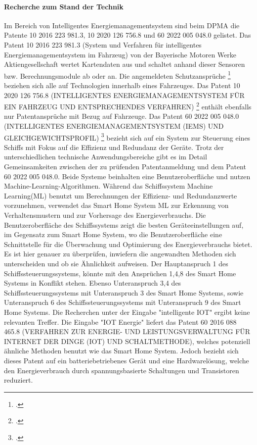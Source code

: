 \paragraph{Recherche zum Stand der Technik}
Im Bereich von Intelligentes Energiemanagementsystem sind beim DPMA die Patente
10 2016 223 981.3, 10 2020 126 756.8 und 60 2022 005 048.0 gelistet. Das Patent
10 2016 223 981.3 (System und Verfahren für intelligentes Energiemanagementsystem im Fahrzeug)
von der Bayerische Motoren Werke Aktiengesellschaft wertet Kartendaten aus 
und schaltet anhand dieser Sensoren bzw. Berechnungsmodule ab oder an.
Die angemeldeten Schutzansprüche \footcite{DPMAregisterRecherchierbarerText} beziehen
sich alle auf Technologien innerhalb eines Fahrzeuges.
Das Patent 10 2020 126 756.8 (INTELLIGENTES ENERGIEMANAGEMENTSYSTEM FÜR EIN FAHRZEUG UND ENTSPRECHENDES VERFAHREN)
\footcite{DPMAregisterRecherchierbarerTexta} enthält ebenfalls nur
Patentansprüche mit Bezug auf Fahrzeuge.
Das Patent 60 2022 005 048.0 (INTELLIGENTES ENERGIEMANAGEMENTSYSTEM (IEMS) UND GLEICHGEWICHTSPROFIL)
\footcite{DPMAregisterRecherchierbarerTextb} bezieht sich auf ein System zur Steuerung eines Schiffs
mit Fokus auf die Effizienz und Redundanz der Geräte. 
Trotz der unterschiedlichen technische Anwendungsbereiche gibt 
es im Detail Gemeinsamkeiten zwischen der zu prüfenden Patentanmeldung 
und dem Patent 60 2022 005 048.0. 
Beide Systeme beinhalten eine Benutzeroberfläche und
nutzen Machine-Learning-Algorithmen. 
Während das Schiffssystem Machine Learning(ML) benutzt um Berechnungen 
der Effizienz- und Redundanzwerte vorzunehmen, verwendet das Smart Home
System ML zur Erkennung von Verhaltensmustern 
und zur Vorhersage des Energieverbrauchs. Die Benutzeroberfläche
des Schiffssystems zeigt die besten Geräteeinstellungen auf,
im Gegensatz zum Smart Home System, wo die 
Benutzeroberfläche eine Schnittstelle für die
Überwachung und Optimierung des Energieverbrauchs bietet.
Es ist hier genauer zu überprüfen, inwiefern die 
angewandten Methoden sich unterscheiden und ob sie Ähnlichkeit aufweisen.
Der Hauptanspruch 1 des Schiffssteuerungssystems, könnte
mit den Ansprüchen 1,4,8 des Smart Home Systems in Konflikt stehen.
Ebenso Unteranspruch 3,4 des Schiffssteuerungssystems mit Unteranspruch 3 des Smart Home Systems,
sowie Unteranspruch 6 des Schiffssteuerungssystems mit Unteranspruch 9 des Smart Home Systems.
Die Recherchen unter der Eingabe "intelligente IOT" ergibt keine relevanten Treffer.
Die Eingabe "IOT Energie" liefert das Patent 60 2016 088 465.8 
(VERFAHREN ZUR ENERGIE- UND LEISTUNGSVERWALTUNG FÜR INTERNET DER DINGE (IOT) UND SCHALTMETHODE),
welches potenziell ähnliche Methoden benutzt wie das Smart Home System.
Jedoch bezieht sich dieses Patent auf ein batteriebetriebenes Gerät
und eine Hardwarelösung,
welche den Energieverbrauch durch spannungsbasierte Schaltungen und Transistoren reduziert.

